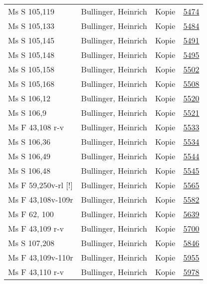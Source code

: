 \documentclass[10pt,a4paper,landscape]{report}
\begin{document}
\begin{longtable}{p{16cm}p{4cm}lr}
Ms S 105,119	&	Bullinger, Heinrich	&	Kopie	&	\href{http://130.60.24.72/assignment/5474}{5474}\\
Ms S 105,133	&	Bullinger, Heinrich	&	Kopie	&	\href{http://130.60.24.72/assignment/5484}{5484}\\
Ms S 105,145	&	Bullinger, Heinrich	&	Kopie	&	\href{http://130.60.24.72/assignment/5491}{5491}\\
Ms S 105,148	&	Bullinger, Heinrich	&	Kopie	&	\href{http://130.60.24.72/assignment/5495}{5495}\\
Ms S 105,158	&	Bullinger, Heinrich	&	Kopie	&	\href{http://130.60.24.72/assignment/5502}{5502}\\
Ms S 105,168	&	Bullinger, Heinrich	&	Kopie	&	\href{http://130.60.24.72/assignment/5508}{5508}\\
Ms S 106,12	&	Bullinger, Heinrich	&	Kopie	&	\href{http://130.60.24.72/assignment/5520}{5520}\\
Ms S 106,9	&	Bullinger, Heinrich	&	Kopie	&	\href{http://130.60.24.72/assignment/5521}{5521}\\
Ms F 43,108 r-v	&	Bullinger, Heinrich	&	Kopie	&	\href{http://130.60.24.72/assignment/5533}{5533}\\
Ms S 106,36	&	Bullinger, Heinrich	&	Kopie	&	\href{http://130.60.24.72/assignment/5534}{5534}\\
Ms S 106,49	&	Bullinger, Heinrich	&	Kopie	&	\href{http://130.60.24.72/assignment/5544}{5544}\\
Ms S 106,48	&	Bullinger, Heinrich	&	Kopie	&	\href{http://130.60.24.72/assignment/5545}{5545}\\
Ms F 59,250v-rl [!]	&	Bullinger, Heinrich	&	Kopie	&	\href{http://130.60.24.72/assignment/5565}{5565}\\
Ms F 43,108v-109r	&	Bullinger, Heinrich	&	Kopie	&	\href{http://130.60.24.72/assignment/5582}{5582}\\
Ms F 62, 100	&	Bullinger, Heinrich	&	Kopie	&	\href{http://130.60.24.72/assignment/5639}{5639}\\
Ms F 43,109 r-v	&	Bullinger, Heinrich	&	Kopie	&	\href{http://130.60.24.72/assignment/5700}{5700}\\
Ms S 107,208	&	Bullinger, Heinrich	&	Kopie	&	\href{http://130.60.24.72/assignment/5846}{5846}\\
Ms F 43,109v-110r	&	Bullinger, Heinrich	&	Kopie	&	\href{http://130.60.24.72/assignment/5955}{5955}\\
Ms F 43,110 r-v	&	Bullinger, Heinrich	&	Kopie	&	\href{http://130.60.24.72/assignment/5978}{5978}\\

\end{longtable}
\end{document}
